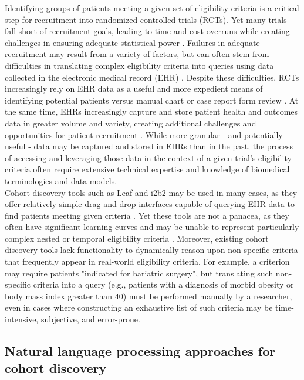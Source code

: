 \documentclass[../main.tex]{subfiles}
\begin{document}
\noindent Identifying groups of patients meeting a given set of eligibility criteria is a critical step for recruitment into randomized controlled trials (RCTs). Yet many trials  fall short of recruitment goals, leading to time and cost overruns while creating challenges in ensuring adequate statistical power \cite{gul2010clinical, adams2015barriers}. Failures in adequate recruitment may result from a variety of factors, but can often stem from difficulties in translating complex eligibility criteria into queries using data collected in the electronic medical record (EHR) \cite{wang2017classifying}. Despite these difficulties, RCTs increasingly rely on EHR data as a useful and more expedient means of identifying potential patients versus manual chart or case report form review \cite{cowie2017electronic}. At the same time, EHRs increasingly capture and store patient health and outcomes data in greater volume and variety, creating additional challenges and opportunities for patient recruitment \cite{lee2017medical}. While more granular - and potentially useful - data may be captured and stored in EHRs than in the past, the process of accessing and leveraging those data in the context of a given trial's eligibility criteria often require extensive technical expertise and knowledge of biomedical terminologies and data models. \\

\noindent Cohort discovery tools such as Leaf \cite{dobbins2019leaf} and i2b2 \cite{murphy2010serving} may be used in many cases, as they offer relatively simple drag-and-drop interfaces capable of querying EHR data to find patients meeting given criteria \cite{johnson2014use}. Yet these tools are not a panacea, as they often have significant learning curves and may be unable to represent particularly complex nested or temporal eligibility criteria \cite{deshmukh2009evaluating}. Moreover, existing cohort discovery tools lack functionality to dynamically reason upon non-specific criteria that frequently appear in real-world eligibility criteria. For example, a criterion may require patients "indicated for bariatric surgery", but translating such non-specific criteria into a query (e.g., patients with a diagnosis of morbid obesity or body mass index greater than 40) must be performed manually by a researcher, even in cases where constructing an exhaustive list of such criteria may be time-intensive, subjective, and error-prone.

\subsection*{Natural language processing approaches for cohort discovery}
\end{document}
